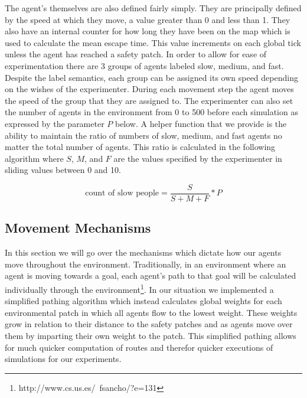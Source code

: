 \documentclass[12pt,letterpaper]{article}
\begin{document}
The agent's themselves are also defined fairly simply.  They are principally defined by the speed at which they move, a value greater than 0 and less than 1.  They also have an internal counter for how long they have been on the map which is used to calculate the mean escape time.  This value increments on each global tick unless the agent has reached a safety patch.  In order to allow for ease of experimentation there are 3 groups of agents labeled slow, medium, and fast.  Despite the label semantics, each group can be assigned its own speed depending on the wishes of the experimenter.  During each movement step the agent moves the speed of the group that they are assigned to.  The experimenter can also set the number of agents in the environment from 0 to 500 before each simulation as expressed by the parameter $P$ below.  A helper function that we provide is the ability to maintain the ratio of numbers of slow, medium, and fast agents no matter the total number of agents.  This ratio is calculated in the following algorithm where $S$, $M$, and $F$ are the values specified by the experimenter in sliding values between 0 and 10.

\begin{equation}
\text{count of slow people} =\frac { S} {S + M + F} * P
\end{equation}

\subsection{Movement Mechanisms} \label{move}
In this section we will go over the mechanisms which dictate how our agents move throughout the environment.  Traditionally, in an environment where an agent is moving towards a goal, each agent's path to that goal will be calculated individually through the environment\footnote{http://www.cs.us.es/~fsancho/?e=131}.  In our situation we implemented a simplified pathing algorithm which instead calculates global weights for each environmental patch in which all agents flow to the lowest weight.  These weights grow in relation to their distance to the safety patches and as agents move over them by imparting their own weight to the patch.  This simplified pathing allows for much quicker computation of routes and therefor quicker executions of simulations for our experiments.
\end{document}
